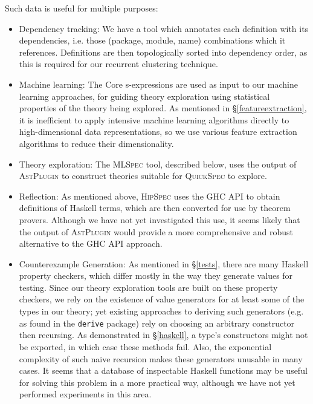 \documentclass[]{article}
\begin{document}
Such data is useful for multiple purposes:

\begin{itemize}
  \item{Dependency tracking}: We have a tool which annotates each definition with its dependencies, i.e. those (package, module, name) combinations which it references. Definitions are then topologically sorted into dependency order, as this is required for our recurrent clustering technique.

  \item{Machine learning}: The Core s-expressions are used as input to our machine learning approaches, for guiding theory exploration using statistical properties of the theory being explored. As mentioned in \S \ref{featureextraction}, it is inefficient to apply intensive machine learning algorithms directly to high-dimensional data representations, so we use various feature extraction algorithms to reduce their dimensionality.

  \item{Theory exploration}: The \textsc{MLSpec} tool, described below, uses the output of \textsc{AstPlugin} to construct theories suitable for \textsc{QuickSpec} to explore.

  \item{Reflection}: As mentioned above, \textsc{HipSpec} uses the GHC API to obtain definitions of Haskell terms, which are then converted for use by theorem provers. Although we have not yet investigated this use, it seems likely that the output of \textsc{AstPlugin} would provide a more comprehensive and robust alternative to the GHC API approach.

  \item{Counterexample Generation}: As mentioned in \S \ref{tests}, there are many Haskell property checkers, which differ mostly in the way they generate values for testing. Since our theory exploration tools are built on these property checkers, we rely on the existence of value generators for at least some of the types in our theory; yet existing approaches to deriving such generators (e.g. as found in the \texttt{derive} package) rely on choosing an arbitrary constructor then recursing. As demonstrated in \S \ref{haskell}, a type's constructors might not be exported, in which case these methods fail. Also, the exponential complexity of such naive recursion makes these generators unusable in many cases. It seems that a database of inspectable Haskell functions may be useful for solving this problem in a more practical way, although we have not yet performed experiments in this area.
\end{itemize}
\end{document}
